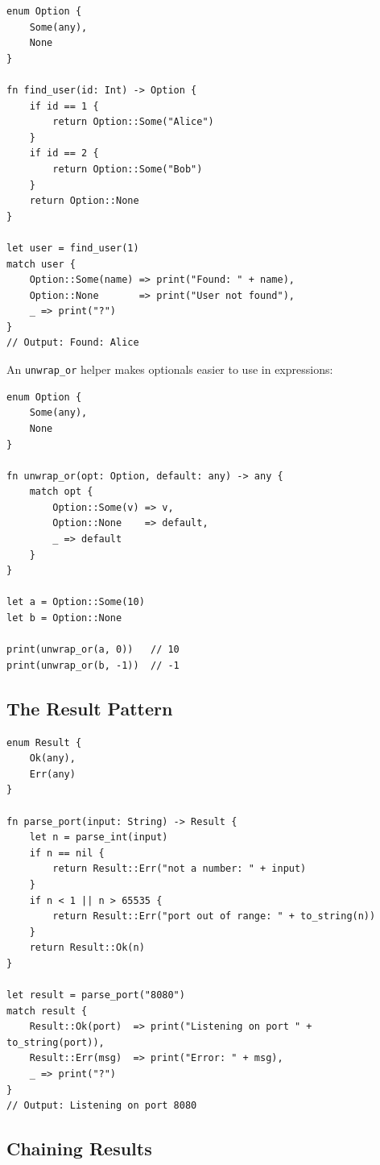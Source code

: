 \begin{lstlisting}[language=Lattice, caption={Defining and using Option}]
enum Option {
    Some(any),
    None
}

fn find_user(id: Int) -> Option {
    if id == 1 {
        return Option::Some("Alice")
    }
    if id == 2 {
        return Option::Some("Bob")
    }
    return Option::None
}

let user = find_user(1)
match user {
    Option::Some(name) => print("Found: " + name),
    Option::None       => print("User not found"),
    _ => print("?")
}
// Output: Found: Alice
\end{lstlisting}

An \lstinline|unwrap_or| helper makes optionals easier to use in
expressions:

\begin{lstlisting}[language=Lattice, caption={An unwrap\_or helper}]
enum Option {
    Some(any),
    None
}

fn unwrap_or(opt: Option, default: any) -> any {
    match opt {
        Option::Some(v) => v,
        Option::None    => default,
        _ => default
    }
}

let a = Option::Some(10)
let b = Option::None

print(unwrap_or(a, 0))   // 10
print(unwrap_or(b, -1))  // -1
\end{lstlisting}

\subsection{The Result Pattern}

\begin{lstlisting}[language=Lattice, caption={Defining and using Result}]
enum Result {
    Ok(any),
    Err(any)
}

fn parse_port(input: String) -> Result {
    let n = parse_int(input)
    if n == nil {
        return Result::Err("not a number: " + input)
    }
    if n < 1 || n > 65535 {
        return Result::Err("port out of range: " + to_string(n))
    }
    return Result::Ok(n)
}

let result = parse_port("8080")
match result {
    Result::Ok(port)  => print("Listening on port " + to_string(port)),
    Result::Err(msg)  => print("Error: " + msg),
    _ => print("?")
}
// Output: Listening on port 8080
\end{lstlisting}

\subsection{Chaining Results}

